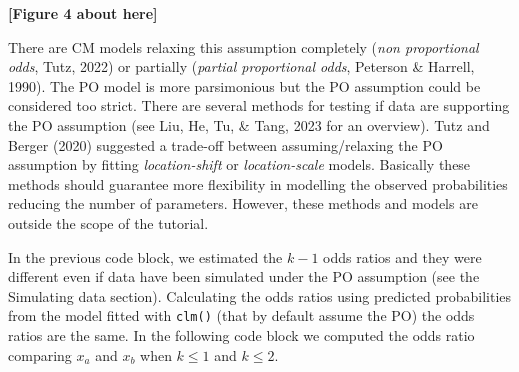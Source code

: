 \documentclass[
  man,floatsintext]{apa6}
\begin{document}
\begin{center}\textbf{[Figure 4 about here]} \end{center}

\normalsize

There are CM models relaxing this assumption completely (\emph{non proportional odds}, Tutz, 2022) or partially (\emph{partial proportional odds}, Peterson \& Harrell, 1990). The PO model is more parsimonious but the PO assumption could be considered too strict. There are several methods for testing if data are supporting the PO assumption (see Liu, He, Tu, \& Tang, 2023 for an overview). Tutz and Berger (2020) suggested a trade-off between assuming/relaxing the PO assumption by fitting \emph{location-shift} or \emph{location-scale} models. Basically these methods should guarantee more flexibility in modelling the observed probabilities reducing the number of parameters. However, these methods and models are outside the scope of the tutorial.

In the previous code block, we estimated the \(k - 1\) odds ratios and they were different even if data have been simulated under the PO assumption (see the Simulating data section). Calculating the odds ratios using predicted probabilities from the model fitted with \texttt{clm()} (that by default assume the PO) the odds ratios are the same. In the following code block we computed the odds ratio comparing \(x_a\) and \(x_b\) when \(k \leq 1\) and \(k \leq 2\).

\scriptsize
\end{document}
